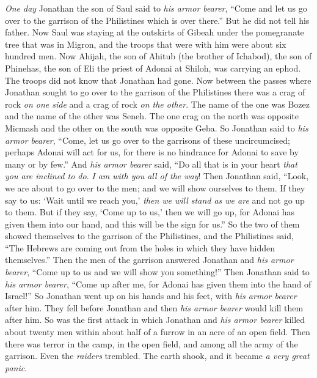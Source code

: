 \begin{biblechapter} %
 \textit{One day} Jonathan the son of Saul said to \textit{his armor bearer}, “Come and let us go over to the garrison of the Philistines which is over there.” But he did not tell his father.
\verse Now Saul was staying at the outskirts of Gibeah under the pomegranate tree that was in Migron, and the troops that were with him were about six hundred men.
\verse Now Ahijah, the son of Ahitub (the brother of Ichabod), the son of Phinehas, the son of Eli the priest of Adonai at Shiloh, was carrying an ephod. The troops did not know that Jonathan had gone.
\verse Now between the passes where Jonathan sought to go over to the garrison of the Philistines there was a crag of rock \textit{on one side} and a crag of rock \textit{on the other}. The name of the one was Bozez and the name of the other was Seneh.
\verse The one crag on the north was opposite Micmash and the other on the south was opposite Geba.
\verse So Jonathan said to \textit{his armor bearer}, “Come, let us go over to the garrisons of these uncircumcised; perhaps Adonai will act for us, for there is no hindrance for Adonai to save by many or by few.”
\verse And \textit{his armor bearer} said, “Do all that is in your heart \textit{that you are inclined to do}. \textit{I am with you all of the way}!
\verse Then Jonathan said, “Look, we are about to go over to the men; and we will show ourselves to them.
\verse If they say to us: ‘Wait until we reach you,’ \textit{then we will stand as we are} and not go up to them.
\verse But if they say, ‘Come up to us,’ then we will go up, for Adonai has given them into our hand, and this will be the sign for us.”
\verse So the two of them showed themselves to the garrison of the Philistines, and the Philistines said, “The Hebrews are coming out from the holes in which they have hidden themselves.”
\verse Then the men of the garrison answered Jonathan and \textit{his armor bearer}, “Come up to us and we will show you something!” Then Jonathan said to \textit{his armor bearer}, “Come up after me, for Adonai has given them into the hand of Israel!”
\verse So Jonathan went up on his hands and his feet, with \textit{his armor bearer} after him. They fell before Jonathan and then \textit{his armor bearer} would kill them after him.
\verse So was the first attack in which Jonathan and \textit{his armor bearer} killed about twenty men within about half of a furrow in an acre of an open field.
\verse Then there was terror in the camp, in the open field, and among all the army of the garrison. Even the \textit{raiders} trembled. The earth shook, and it became \textit{a very great panic}.

\end{biblechapter}

